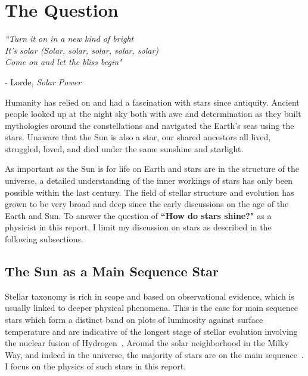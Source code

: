 \documentclass[12pt]{article}
\begin{document}
\section{The Question}
\begin{flushleft} \singlespacing \vspace{-0.25cm}
    \textit{``Turn it on in a new kind of bright}\\
    \textit{It's solar (Solar, solar, solar, solar, solar)} \\
    \textit{Come on and let the bliss begin"} \\
\end{flushleft} 
\begin{flushright} \vspace{-0.5cm}
    - Lorde, \textit{Solar Power}
\end{flushright}
\doublespacing
%
Humanity has relied on and had a fascination with stars since antiquity. Ancient people looked up at the night sky both with awe and determination as they built mythologies around the constellations and navigated the Earth's seas using the stars. Unaware that the Sun is also a star, our shared ancestors all lived, struggled, loved, and died under the same sunshine and starlight.

As important as the Sun is for life on Earth and stars are in the structure of the universe, a detailed understanding of the inner workings of stars has only been possible within the last century. The field of stellar structure and evolution has grown to be very broad and deep since the early discussions on the age of the Earth and Sun. To answer the question of \textbf{``How do stars shine?"} as a physicist in this report, I limit my discussion on stars as described in the following subsections. 
\subsection{The Sun as a Main Sequence Star}
Stellar taxonomy is rich in scope and based on observational evidence, which is usually linked to deeper physical phenomena. This is the case for main sequence stars which form a distinct band on plots of luminosity against surface temperature and are indicative of the longest stage of stellar evolution involving the nuclear fusion of Hydrogen~\cite{Prialnik}. Around the solar neighborhood in the Milky Way, and indeed in the universe, the majority of stars are on the main sequence~\cite{BoB}. I focus on the physics of such stars in this report.
\end{document}
